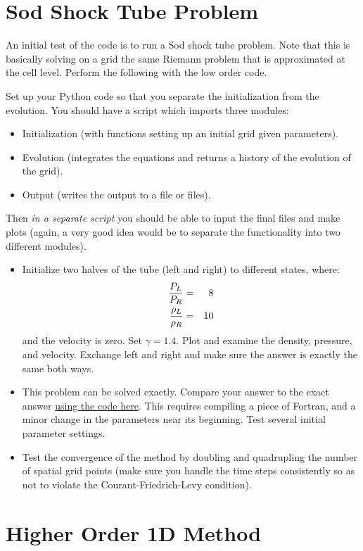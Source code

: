 \documentclass[11pt, preprint]{aastex}
\begin{document}
\section{Sod Shock Tube Problem}

An initial test of the code is to run a Sod shock tube problem. Note
that this is basically solving on a grid the same Riemann problem that
is approximated at the cell level. Perform the following with the
low order code.

Set up your Python code so that you separate the initialization from
the evolution. You should have a script which imports three modules: 
\begin{itemize}
  \item Initialization (with functions setting up an initial grid
    given parameters).
  \item Evolution (integrates the equations and returns a history of
    the evolution of the grid).
  \item Output (writes the output to a file or files).
\end{itemize}
Then {\it in a separate script} you should be able to input the final
files and make plots (again, a very good idea would be to separate the
functionality into two different modules).

\begin{itemize}
\item Initialize two halves of the tube (left and right) to different
  states, where:
  \begin{eqnarray}
    \frac{P_L}{P_R} &=& 8 \cr
    \frac{\rho_L}{\rho_R} &=& 10
  \end{eqnarray}
  and the velocity is zero. Set $\gamma=1.4$. Plot and examine the
  density, pressure, and velocity. Exchange left and right and make
  sure the answer is exactly the same both ways.
\item This problem can be solved exactly. Compare your answer to the
  exact answer
  \href{https://cococubed.com/code\_pages/exact\_riemann.shtml}{using
    the code here}. This requires compiling a piece of Fortran, and a
  minor change in the parameters near its beginning. Test several
  initial parameter settings.
\item Test the convergence of the method by doubling and quadrupling
  the number of spatial grid points (make sure you handle the time
  steps consistently so as not to violate the Courant-Friedrich-Levy
  condition).
\end{itemize}

\section{Higher Order 1D Method}
\end{document}
